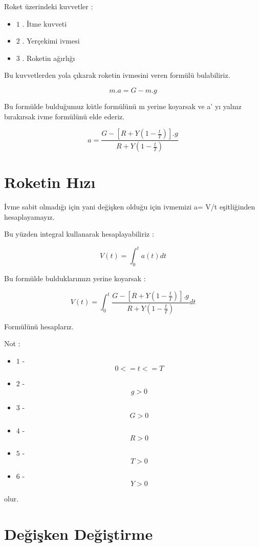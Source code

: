 \documentclass[a4paper,10pt]{article}
\begin{document}
Roket üzerindeki kuvvetler : 
\begin{itemize}
\item $1$ . İtme kuvveti
  
\item $2$ . Yerçekimi ivmesi 

\item $3$ .  Roketin ağırlığı

\end{itemize}

Bu kuvvetlerden yola çıkarak roketin ivmesini veren formülü bulabiliriz.

\[
 m.a = G - m.g
\]


Bu formülde bulduğumuz kütle formülünü m yerine koyarsak ve a' yı yalnız bırakırsak ivme formülünü elde ederiz.


\[
a = \frac {G - [ R + Y ( 1 - \frac{t}{T} ) ].g }{R + Y ( 1 - \frac{t}{T})}
\]


\section{Roketin Hızı}

İvme sabit olmadığı için yani değişken olduğu için ivmemizi        a= V/t eşitliğinden hesaplayamayız.


Bu yüzden integral kullanarak hesaplayabiliriz :

\[
 V(t) = \int_0^t a(t)dt 
\]

Bu formülde bulduklarımızı yerine koyarsak :

\[
 V(t) = \int_0^t\frac{G - [R + Y (1 - \frac{t}{T})].g}{R + Y (1 - \frac{t}{T} )}dt
\]


Formülünü hesaplarız.

Not :
 \begin{itemize}
  \item $1$ - \[0 <= t <= T\]
  \item $2$ - \[ g > 0\]
  \item $3$ - \[G > 0 \]
  \item $4$ - \[R > 0 \]
  \item $5$ - \[T > 0 \]
  \item $6$ - \[Y > 0\]

  \end{itemize}
    
    olur.

\section{Değişken Değiştirme}
\end{document}

